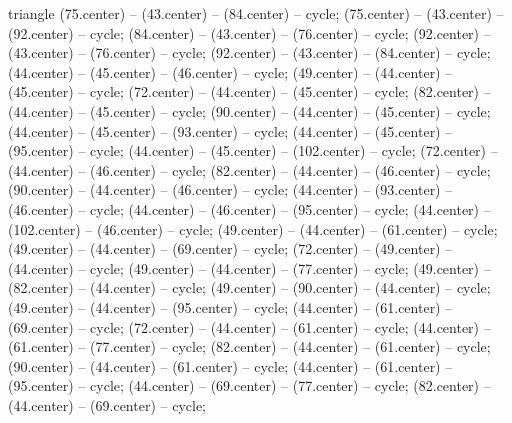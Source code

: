 \begin{pgfonlayer}{triangle}
 (75.center) -- (43.center) -- (84.center) -- cycle; 
 (75.center) -- (43.center) -- (92.center) -- cycle; 
 (84.center) -- (43.center) -- (76.center) -- cycle; 
 (92.center) -- (43.center) -- (76.center) -- cycle; 
 (92.center) -- (43.center) -- (84.center) -- cycle; 
 (44.center) -- (45.center) -- (46.center) -- cycle; 
 (49.center) -- (44.center) -- (45.center) -- cycle; 
 (72.center) -- (44.center) -- (45.center) -- cycle; 
 (82.center) -- (44.center) -- (45.center) -- cycle; 
 (90.center) -- (44.center) -- (45.center) -- cycle; 
 (44.center) -- (45.center) -- (93.center) -- cycle; 
 (44.center) -- (45.center) -- (95.center) -- cycle; 
 (44.center) -- (45.center) -- (102.center) -- cycle; 
 (72.center) -- (44.center) -- (46.center) -- cycle; 
 (82.center) -- (44.center) -- (46.center) -- cycle; 
 (90.center) -- (44.center) -- (46.center) -- cycle; 
 (44.center) -- (93.center) -- (46.center) -- cycle; 
 (44.center) -- (46.center) -- (95.center) -- cycle; 
 (44.center) -- (102.center) -- (46.center) -- cycle; 
 (49.center) -- (44.center) -- (61.center) -- cycle; 
 (49.center) -- (44.center) -- (69.center) -- cycle; 
 (72.center) -- (49.center) -- (44.center) -- cycle; 
 (49.center) -- (44.center) -- (77.center) -- cycle; 
 (49.center) -- (82.center) -- (44.center) -- cycle; 
 (49.center) -- (90.center) -- (44.center) -- cycle; 
 (49.center) -- (44.center) -- (95.center) -- cycle; 
 (44.center) -- (61.center) -- (69.center) -- cycle; 
 (72.center) -- (44.center) -- (61.center) -- cycle; 
 (44.center) -- (61.center) -- (77.center) -- cycle; 
 (82.center) -- (44.center) -- (61.center) -- cycle; 
 (90.center) -- (44.center) -- (61.center) -- cycle; 
 (44.center) -- (61.center) -- (95.center) -- cycle; 
 (44.center) -- (69.center) -- (77.center) -- cycle; 
 (82.center) -- (44.center) -- (69.center) -- cycle; 

\end{pgfonlayer}
